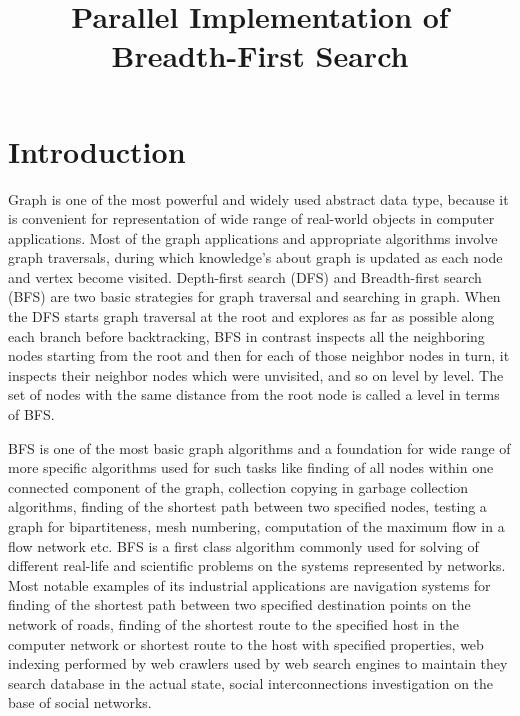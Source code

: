 \documentclass[letterpaper]{article}
\title{Parallel Implementation of Breadth-First Search} %
\begin{document}
	\maketitle

	\begin{abstract} %
		 
	\end{abstract}

	\section{Introduction}\label{sec:intro} %
		Graph is one of the most powerful and widely used abstract data type, because it is convenient for representation of wide range of real-world objects in computer applications.
		Most of the graph applications and appropriate algorithms involve graph traversals, during which knowledge's about graph is updated as each node and vertex become visited. 
		Depth-first search (DFS) and Breadth-first search (BFS) are two basic strategies for graph traversal and searching in graph.
		When the DFS starts graph traversal at the root and explores as far as possible along each branch before backtracking, BFS in contrast inspects all the neighboring nodes starting from the root and then for each of those neighbor nodes in turn, it inspects their neighbor nodes which were unvisited, and so on level by level.
		The set of nodes with the same distance from the root node is called a level in terms of BFS.
				
		BFS is one of the most basic graph algorithms and a foundation for wide range of more specific algorithms used for such tasks like finding of all nodes within one connected component of the graph, collection copying in garbage collection algorithms, finding of the shortest path between two specified nodes, testing a graph for bipartiteness, mesh numbering, computation of the maximum flow in a flow network etc.
		BFS is a first class algorithm commonly used for solving of different real-life and scientific problems on the systems represented by networks.
		Most notable examples of its industrial applications are navigation systems for finding of the shortest path between two specified destination points on the network of roads, finding of the shortest route to the specified host in the computer network or shortest route to the host with specified properties, web indexing performed by web crawlers used by web search engines to maintain they search database in the actual state, social interconnections investigation on the base of social networks.
		
\end{document}
